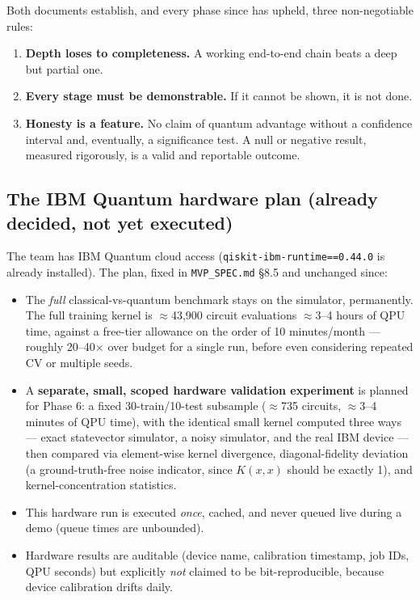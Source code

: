 \documentclass[11pt,a4paper]{article}
\newcommand{\code}[1]{\texttt{\small #1}}
\begin{document}
Both documents establish, and every phase since has upheld, three non-negotiable rules:
\begin{enumerate}[leftmargin=1.4em]
  \item \textbf{Depth loses to completeness.} A working end-to-end chain beats a deep but partial one.
  \item \textbf{Every stage must be demonstrable.} If it cannot be shown, it is not done.
  \item \textbf{Honesty is a feature.} No claim of quantum advantage without a confidence interval and, eventually, a significance test. A null or negative result, measured rigorously, is a valid and reportable outcome.
\end{enumerate}

\subsection{The IBM Quantum hardware plan (already decided, not yet executed)}
\label{sec:ibm-plan}

The team has IBM Quantum cloud access (\code{qiskit-ibm-runtime==0.44.0} is already installed). The plan, fixed in \code{MVP\_SPEC.md} \S8.5 and unchanged since:

\begin{itemize}[leftmargin=1.4em]
  \item The \emph{full} classical-vs-quantum benchmark stays on the simulator, permanently. The full training kernel is $\approx$43{,}900 circuit evaluations $\approx$3--4 hours of QPU time, against a free-tier allowance on the order of 10 minutes/month --- roughly 20--40$\times$ over budget for a single run, before even considering repeated CV or multiple seeds.
  \item A \textbf{separate, small, scoped hardware validation experiment} is planned for Phase 6: a fixed 30-train/10-test subsample ($\approx$735 circuits, $\approx$3--4 minutes of QPU time), with the identical small kernel computed three ways --- exact statevector simulator, a noisy simulator, and the real IBM device --- then compared via element-wise kernel divergence, diagonal-fidelity deviation (a ground-truth-free noise indicator, since $K(x,x)$ should be exactly 1), and kernel-concentration statistics.
  \item This hardware run is executed \emph{once}, cached, and never queued live during a demo (queue times are unbounded).
  \item Hardware results are auditable (device name, calibration timestamp, job IDs, QPU seconds) but explicitly \emph{not} claimed to be bit-reproducible, because device calibration drifts daily.
\end{itemize}
\end{document}
